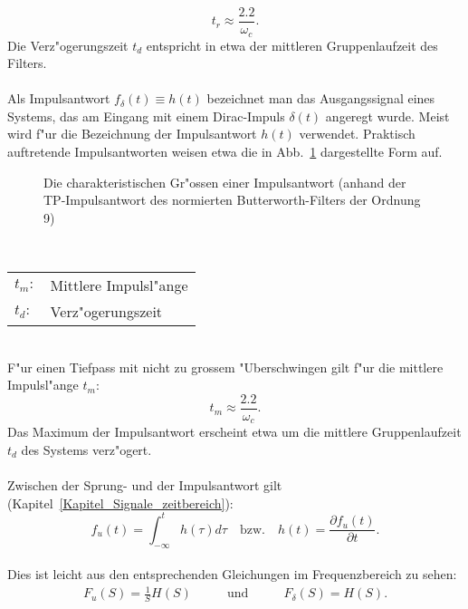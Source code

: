 \[
t_{r} \approx \frac{2.2}{\omega_{c}}.
\]
Die Verz"ogerungszeit $t_d$ entspricht in etwa der mittleren
Gruppenlaufzeit des
Filters.\\
\\
\nit Als Impulsantwort $f_{\delta}(t)\equiv h(t)$
bezeichnet man das Ausgangssignal eines Systems, das am Eingang mit
einem Dirac-Impuls $\delta(t)$ angeregt wurde. Meist wird
f"ur die Bezeichnung der Impulsantwort $h(t)$ verwendet.
Praktisch auftretende Impulsantworten weisen etwa die in
Abb.~\ref{grossen-stoss} dargestellte Form auf.\\
\begin{figure}[!htb]
\begin{center}%
  \vspace*{-3mm}\caption{Die charakteristischen Gr"ossen einer Impulsantwort (anhand der  TP-Impulsantwort des normierten Butterworth-Filters der Ordnung 9)}
\label{grossen-stoss}
\end{center}
\vspace*{-6mm}
\end{figure}\\
\begin{tabular}{ll}
\hspace*{9mm}$t_{m}:$ \hspace*{1cm} & Mittlere Impulsl"ange \\
\hspace*{9mm}$t_{d}:$              & Verz"ogerungszeit \\
\end{tabular}\\
\nit F"ur einen Tiefpass mit nicht zu grossem "Uberschwingen gilt f"ur die
mittlere Impulsl"ange $t_m$:
\[
t_{m} \approx \frac{2.2}{\omega_{c}}.
\]
\nit Das Maximum der Impulsantwort erscheint etwa um die mittlere
Gruppenlaufzeit $t_d$ des Systems verz"ogert.\\
\\
\nit Zwischen der Sprung- und der Impulsantwort gilt (Kapitel~\ref{Kapitel_Signale_zeitbereich}):
\begin{equation}
f_{u}(t)=\int_{-\infty}^{t} h(\tau) d\tau\quad\text{bzw.}\quad h(t)=\frac{\partial f_{u}(t)}{\partial t}.
\end{equation}\\
Dies ist leicht aus den entsprechenden Gleichungen im Frequenzbereich zu
sehen:
\begin{eqnarray}
F_{u}(S)=\frac{1}{S}H(S)\qquad&\text{und}&\qquad F_{\delta}(S)=H(S).\nonumber
\end{eqnarray}                 
